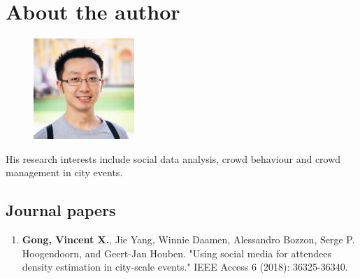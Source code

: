 \chapter*{About the author}


\begin{figure}
\includegraphics[width=0.34\textwidth, trim=0 0 0 0.8cm]{./0-misc/images/vincent.png}
\end{figure}

His research interests include social data analysis, crowd behaviour and crowd management in city events.



\vspace*{\fill}
\pagebreak

\vspace*{0.60cm}

\section*{Journal papers}

\begin{enumerate}
  \item \textbf{Gong, Vincent X.}, Jie Yang, Winnie Daamen, Alessandro Bozzon, Serge P. Hoogendoorn, and Geert-Jan Houben. "Using social media for attendees density estimation in city-scale events." IEEE Access 6 (2018): 36325-36340.
\end{enumerate}



